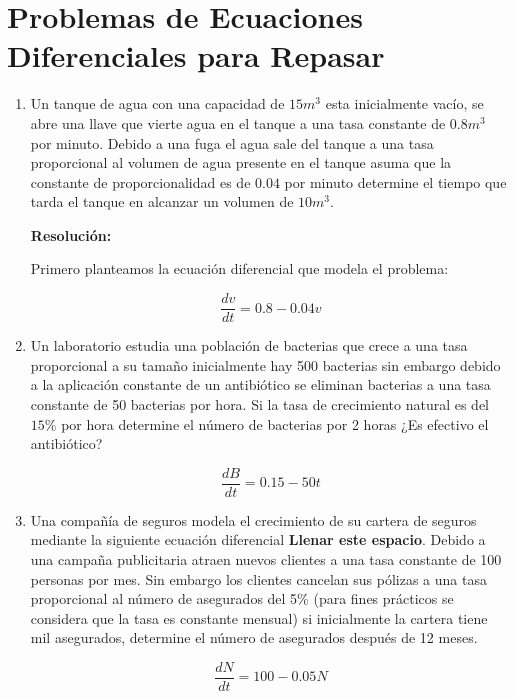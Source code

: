 \documentclass[10pt,a4paper]{article}
\begin{document}
    \section{Problemas de Ecuaciones Diferenciales para Repasar}

	\begin{enumerate}
		\item Un tanque de agua con una capacidad de $15 m^3$ esta inicialmente vacío, se abre una llave que vierte agua en el tanque a una tasa constante de $0.8 m^3$ por minuto. Debido a una fuga el agua sale del tanque a una tasa proporcional al volumen de agua presente en el tanque asuma que la constante de proporcionalidad es de $0.04$ por minuto determine el tiempo que tarda el tanque en alcanzar un volumen de $10m^3$.
		
        \textbf{Resolución:}

        Primero planteamos la ecuación diferencial que modela el problema:

        $$\frac{dv}{dt} = 0.8 - 0.04v$$


        \item Un laboratorio estudia una población de bacterias que crece a una tasa proporcional a su tamaño inicialmente hay 500 bacterias sin embargo debido a la aplicación constante de un antibiótico se eliminan bacterias a una tasa constante de 50 bacterias por hora. Si la tasa de crecimiento natural es del $15\%$ por hora determine el número de bacterias por 2 horas ¿Es efectivo el antibiótico?

        $$\frac{dB}{dt} = 0.15 - 50t$$

        \item Una compañía de seguros modela el crecimiento de su cartera de seguros mediante la siguiente ecuación diferencial \textbf{Llenar este espacio}. Debido a una campaña publicitaria atraen nuevos clientes a una tasa constante de 100 personas por mes. Sin embargo los clientes cancelan sus pólizas a una tasa proporcional al número de asegurados del 5\% (para fines prácticos se considera que la tasa es constante mensual) si inicialmente la cartera tiene mil asegurados, determine el número de asegurados después de 12 meses.

        $$\frac{dN}{dt} = 100 - 0.05N$$



	\end{enumerate}	
\end{document}
